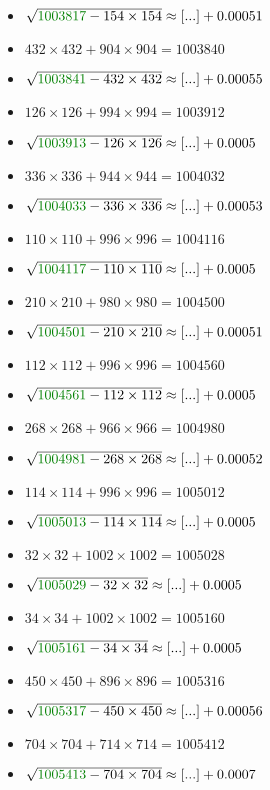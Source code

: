 \documentclass[12pt]{article}
\begin{document}
\begin{multicols}{2}
\begin{itemize}
\item $\sqrt{ {\color{green!50!black}{1003817}} - 154\times 154 } \approx [...] + 0.00051$
\item $432\times432 + 904\times904 = 1003840$
\item $\sqrt{ {\color{green!50!black}{1003841}} - 432\times 432 } \approx [...] + 0.00055$
\item $126\times126 + 994\times994 = 1003912$
\item $\sqrt{ {\color{green!50!black}{1003913}} - 126\times 126 } \approx [...] + 0.0005$
\item $336\times336 + 944\times944 = 1004032$
\item $\sqrt{ {\color{green!50!black}{1004033}} - 336\times 336 } \approx [...] + 0.00053$
\item $110\times110 + 996\times996 = 1004116$
\item $\sqrt{ {\color{green!50!black}{1004117}} - 110\times 110 } \approx [...] + 0.0005$
\item $210\times210 + 980\times980 = 1004500$
\item $\sqrt{ {\color{green!50!black}{1004501}} - 210\times 210 } \approx [...] + 0.00051$
\item $112\times112 + 996\times996 = 1004560$
\item $\sqrt{ {\color{green!50!black}{1004561}} - 112\times 112 } \approx [...] + 0.0005$
\item $268\times268 + 966\times966 = 1004980$
\item $\sqrt{ {\color{green!50!black}{1004981}} - 268\times 268 } \approx [...] + 0.00052$
\item $114\times114 + 996\times996 = 1005012$
\item $\sqrt{ {\color{green!50!black}{1005013}} - 114\times 114 } \approx [...] + 0.0005$
\item $32\times32 + 1002\times1002 = 1005028$
\item $\sqrt{ {\color{green!50!black}{1005029}} - 32\times 32 } \approx [...] + 0.0005$
\item $34\times34 + 1002\times1002 = 1005160$
\item $\sqrt{ {\color{green!50!black}{1005161}} - 34\times 34 } \approx [...] + 0.0005$
\item $450\times450 + 896\times896 = 1005316$
\item $\sqrt{ {\color{green!50!black}{1005317}} - 450\times 450 } \approx [...] + 0.00056$
\item $704\times704 + 714\times714 = 1005412$
\item $\sqrt{ {\color{green!50!black}{1005413}} - 704\times 704 } \approx [...] + 0.0007$

\end{itemize}
\end{multicols}
\end{document}
